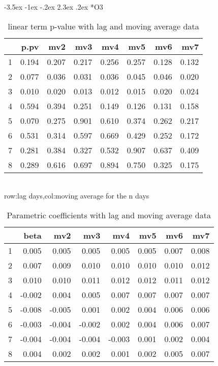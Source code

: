 \documentclass[a4paper, 12pt]{article}
\makeatletter
\def\large{\fontsize{14}{20}\selectfont}
\renewcommand\subsection{\@startsection {subsection}{1}{\z@}%
                                   {-3.5ex \@plus -1ex \@minus -.2ex}%
                                   {2.3ex \@plus.2ex}%
                                   {\centering\normalfont\large\bfseries}}
\makeatother
\begin{document}
\subsection*{O3}
\begin{table}[h]
\centering
\caption{linear term p-value with lag and moving average data}
\begin{tabular}{rrrrrrrr}
  \hline
 & p.pv & mv2 & mv3 & mv4 & mv5 & mv6 & mv7 \\
  \hline
1 & 0.194 & 0.207 & 0.217 & 0.256 & 0.257 & 0.128 & 0.132 \\
  2 & 0.077 & 0.036 & 0.031 & 0.036 & 0.045 & 0.046 & 0.020 \\
  3 & 0.010 & 0.020 & 0.013 & 0.012 & 0.015 & 0.020 & 0.024 \\
  4 & 0.594 & 0.394 & 0.251 & 0.149 & 0.126 & 0.131 & 0.158 \\
  5 & 0.070 & 0.275 & 0.901 & 0.610 & 0.374 & 0.262 & 0.217 \\
  6 & 0.531 & 0.314 & 0.597 & 0.669 & 0.429 & 0.252 & 0.172 \\
  7 & 0.281 & 0.384 & 0.327 & 0.532 & 0.907 & 0.637 & 0.409 \\
  8 & 0.289 & 0.616 & 0.697 & 0.894 & 0.750 & 0.325 & 0.175 \\
   \hline
\end{tabular}
\\row:lag days,col:moving average for the n days
\end{table}

\begin{table}[h]
\centering
\caption{Parametric coefficients with lag and moving average data}
\begin{tabular}{rrrrrrrr}
  \hline
 & beta & mv2 & mv3 & mv4 & mv5 & mv6 & mv7 \\
  \hline
1 & 0.005 & 0.005 & 0.005 & 0.005 & 0.005 & 0.007 & 0.008 \\
  2 & 0.007 & 0.009 & 0.010 & 0.010 & 0.010 & 0.010 & 0.012 \\
  3 & 0.010 & 0.010 & 0.011 & 0.012 & 0.012 & 0.011 & 0.012 \\
  4 & -0.002 & 0.004 & 0.005 & 0.007 & 0.007 & 0.007 & 0.007 \\
  5 & -0.008 & -0.005 & 0.001 & 0.002 & 0.004 & 0.006 & 0.006 \\
  6 & -0.003 & -0.004 & -0.002 & 0.002 & 0.004 & 0.006 & 0.007 \\
  7 & -0.004 & -0.004 & -0.004 & -0.003 & 0.001 & 0.002 & 0.004 \\
  8 & 0.004 & 0.002 & 0.002 & 0.001 & 0.002 & 0.005 & 0.007 \\
   \hline
\end{tabular}
\end{table}
\clearpage
\end{document}
